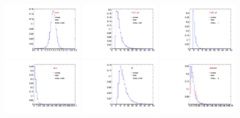 \begin{figure}
  \includegraphics[width=0.3\textwidth]{Figures/VariablesComparison/MC_endcaps_figs/m}
  \includegraphics[width=0.3\textwidth]{Figures/VariablesComparison/MC_endcaps_figs/m1pt}
  \includegraphics[width=0.3\textwidth]{Figures/VariablesComparison/MC_endcaps_figs/m2pt}
  \includegraphics[width=0.3\textwidth]{Figures/VariablesComparison/MC_endcaps_figs/maxdoca}
  \includegraphics[width=0.3\textwidth]{Figures/VariablesComparison/MC_endcaps_figs/pt}
  \includegraphics[width=0.3\textwidth]{Figures/VariablesComparison/MC_endcaps_figs/pvip}

\end{figure}
